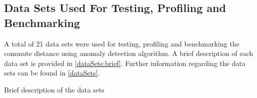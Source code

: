 \subsection{Data Sets Used For Testing, Profiling and Benchmarking}
\label{software:datasets}
A total of 21 data sets were used for testing, profiling and benchmarking the
commute distance using anomaly detection algorithm. A brief description of each
data set is provided in \autoref{dataSets:brief}. Further information regarding
the data sets can be found in \autoref{dataSets}.

\begin{table}[h]
    \centering
    \begin{datasets}
    \end{datasets}
    \caption{Brief description of the data sets}
    \label{dataSets:brief}
\end{table}